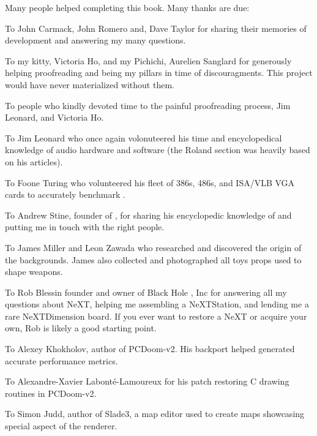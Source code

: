 Many people helped completing this book. Many thanks are due:\\
\par
To John Carmack, John Romero and, Dave Taylor for sharing their memories of \doom{} development and answering my many questions.\\
\par
To my kitty, Victoria Ho, and my Pichichi, Aurelien Sanglard for generously helping proofreading and being my pillars in time of discouragments. This project would have never materialized without them.\\ 
\par
To people who kindly devoted time to the painful proofreading process, Jim Leonard, and Victoria Ho.\\
\par
To Jim Leonard who once again volonuteered his time and encyclopedical knowledge of audio hardware and software (the Roland section was heavily based on his articles).
\par
To Foone Turing who volunteered his fleet of 386s, 486s, and ISA/VLB VGA cards to accurately benchmark \doom{}.\\
\par
To Andrew Stine, founder of , for sharing his encyclopedic knowledge of \doom{} and putting me in touch with the right people.\\
\par
To James Miller and Leon Zawada who researched and discovered the origin of the backgrounds. James also collected and photographed all toys props used to shape \doom{} weapons.\\
\par
To Rob Blessin founder and owner of Black Hole , Inc for answering all my questions about NeXT, helping me assembling a NeXTStation, and lending me a rare NeXTDimension board. If you ever want to restore a NeXT or acquire your own, Rob is likely a good starting point.\\
\par
To Alexey Khokholov, author of PCDoom-v2. His backport helped generated accurate performance metrics.\\
\par
To Alexandre-Xavier Labont\'e-Lamoureux for his patch restoring C drawing routines in PCDoom-v2.\\
\par
To Simon Judd, author of Slade3, a map editor used to create maps showcasing special aspect of the renderer.\\
